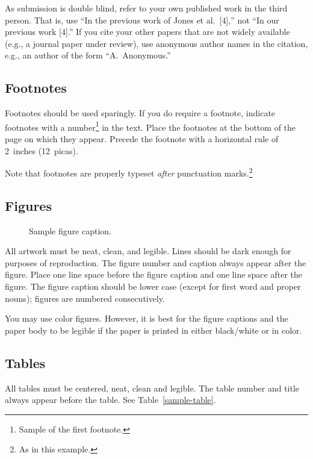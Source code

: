 \documentclass{article}
\begin{document}
As submission is double blind, refer to your own published work in the third
person. That is, use ``In the previous work of Jones et al.\ [4],'' not ``In our
previous work [4].'' If you cite your other papers that are not widely available
(e.g., a journal paper under review), use anonymous author names in the
citation, e.g., an author of the form ``A.\ Anonymous.''

\subsection{Footnotes}

Footnotes should be used sparingly.  If you do require a footnote, indicate
footnotes with a number\footnote{Sample of the first footnote.} in the
text. Place the footnotes at the bottom of the page on which they appear.
Precede the footnote with a horizontal rule of 2~inches (12~picas).

Note that footnotes are properly typeset \emph{after} punctuation
marks.\footnote{As in this example.}

\subsection{Figures}

\begin{figure}
  \centering
  \fbox{\rule[-.5cm]{0cm}{4cm} \rule[-.5cm]{4cm}{0cm}}
  \caption{Sample figure caption.}
\end{figure}

All artwork must be neat, clean, and legible. Lines should be dark enough for
purposes of reproduction. The figure number and caption always appear after the
figure. Place one line space before the figure caption and one line space after
the figure. The figure caption should be lower case (except for first word and
proper nouns); figures are numbered consecutively.

You may use color figures.  However, it is best for the figure captions and the
paper body to be legible if the paper is printed in either black/white or in
color.

\cite{texbook}
\subsection{Tables}

All tables must be centered, neat, clean and legible.  The table number and
title always appear before the table.  See Table~\ref{sample-table}.
\end{document}
